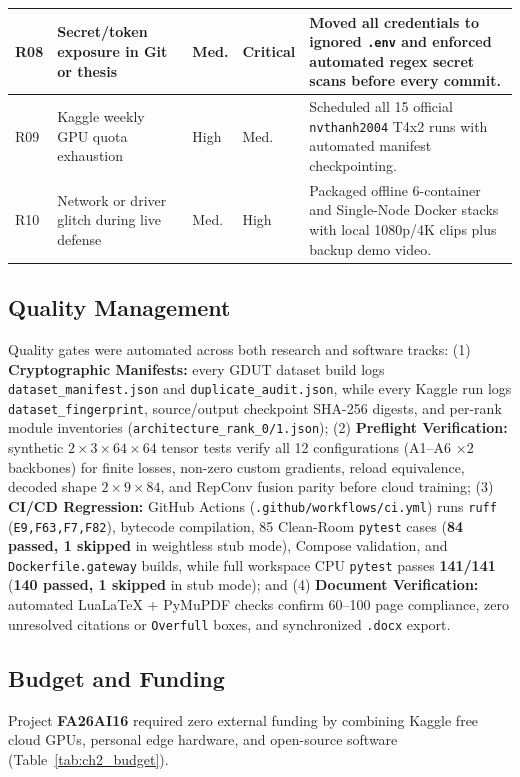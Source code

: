 \begin{longtable}{|>{\centering\arraybackslash}p{0.8cm}|>{\raggedright\arraybackslash}p{2.9cm}|>{\centering\arraybackslash}p{1.3cm}|>{\centering\arraybackslash}p{1.4cm}|>{\raggedright\arraybackslash}p{6.9cm}|}
R08 & Secret/token exposure in Git or thesis & Med. & Critical & Moved all credentials to ignored \texttt{.env} and enforced automated regex secret scans before every commit. \\ \hline
R09 & Kaggle weekly GPU quota exhaustion & High & Med. & Scheduled all 15 official \texttt{nvthanh2004} T4x2 runs with automated manifest checkpointing. \\ \hline
R10 & Network or driver glitch during live defense & Med. & High & Packaged offline 6-container and Single-Node Docker stacks with local 1080p/4K clips plus backup demo video. \\
\end{longtable}

\subsection{Quality Management}

Quality gates were automated across both research and software tracks: (1) \textbf{Cryptographic Manifests:} every GDUT dataset build logs \nolinkurl{dataset_manifest.json} and \nolinkurl{duplicate_audit.json}, while every Kaggle run logs \nolinkurl{dataset_fingerprint}, source/output checkpoint SHA-256 digests, and per-rank module inventories (\nolinkurl{architecture_rank_0/1.json}); (2) \textbf{Preflight Verification:} synthetic $2 \times 3 \times 64 \times 64$ tensor tests verify all 12 configurations (A1--A6 $\times 2$ backbones) for finite losses, non-zero custom gradients, reload equivalence, decoded shape $2 \times 9 \times 84$, and RepConv fusion parity before cloud training; (3) \textbf{CI/CD Regression:} GitHub Actions (\nolinkurl{.github/workflows/ci.yml}) runs \texttt{ruff} (\texttt{E9,F63,F7,F82}), bytecode compilation, 85 Clean-Room \texttt{pytest} cases (\textbf{84 passed, 1 skipped} in weightless stub mode), Compose validation, and \nolinkurl{Dockerfile.gateway} builds, while full workspace CPU \texttt{pytest} passes \textbf{141/141} (\textbf{140 passed, 1 skipped} in stub mode); and (4) \textbf{Document Verification:} automated LuaLaTeX + PyMuPDF checks confirm 60--100 page compliance, zero unresolved citations or \texttt{Overfull} boxes, and synchronized \texttt{.docx} export.

\subsection{Budget and Funding}

Project \textbf{FA26AI16} required zero external funding by combining Kaggle free cloud GPUs, personal edge hardware, and open-source software (Table~\ref{tab:ch2_budget}).

